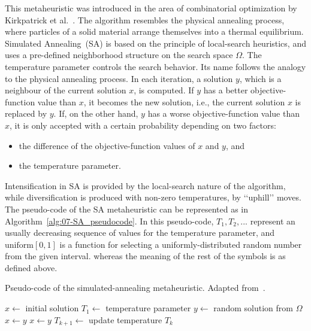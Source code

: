 This metaheuristic was introduced in the area of combinatorial optimization
by Kirkpatrick et al.~\cite{Kirkpatrick_OptimizationBySimulatesAnnealing}.
The algorithm resembles the physical annealing process, where particles
of a solid material arrange themselves into a thermal equilibrium.
Simulated Annealing~(SA)
is based on the principle of local-search heuristics, and uses a pre-defined
neighborhood structure on the search space $\Omega$. The temperature
parameter controls the search behavior. Its name follows the analogy
to the physical annealing process. In each iteration, a solution $y$,
which is a neighbour of the current solution $x$, is computed. If
$y$ has a better objective-function value than $x$, it becomes the
new solution, i.e., the current solution $x$ is replaced by $y$.
If, on the other hand, $y$ has a worse objective-function value than
$x$, it is only accepted with a certain probability depending on
two factors: 
\begin{itemize}
\item the difference of the objective-function values of $x$ and $y$,
and
\item the temperature parameter. 
\end{itemize}
Intensification in SA is provided by the local-search nature of the
algorithm, while diversification is produced with non-zero temperatures,
by \textquoteleft{}\textquoteleft{}uphill\textquoteright{}\textquoteright{}
moves. The pseudo-code of the SA metaheuristic can be represented
as in Algorithm~\ref{alg:07-SA_pseudocode}. In this pseudo-code,
$T_{1},T_{2},...$ represent an usually decreasing sequence of values
for the temperature parameter, and $\mathrm{{uniform}[0,1]}$ is a
function for selecting a uniformly-distributed random number from
the given interval. whereas the meaning of the rest of the symbols
is as defined above. 

\begin{algorithm}
\centering

\caption{Pseudo-code of the simulated-annealing metaheuristic. Adapted from~\cite{Bianchi-A_survey_on_metaheuristics_for_stachastic_combinatorial_optimization:2009}.\textit{\label{alg:07-SA_pseudocode}}}


\begin{algorithmic}
\Require $x \gets$ initial solution
\Require $T_{\mathrm{1}} \gets$ temperature parameter
	\State $y \gets$ random solution from $\Omega$
		\State $x \gets y$
		\State $x \gets y$
	\EndIf
	\State $T_{k+1} \gets$ update temperature $T_{k}$
\EndFor
\end{algorithmic}
\end{algorithm}


